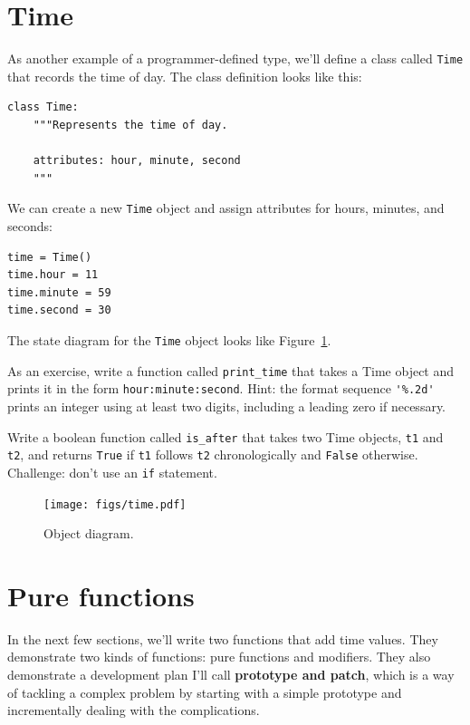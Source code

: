\documentclass[10pt]{book}
\begin{document}
\section{Time}
\label{isafter}

As another example of a programmer-defined type, we'll define a class
called {\tt Time} that records the time of day.  The class definition
looks like this: 
  

\begin{verbatim}
class Time:
    """Represents the time of day.

    attributes: hour, minute, second
    """
\end{verbatim}
%
We can create a new {\tt Time} object and assign
attributes for hours, minutes, and seconds:

\begin{verbatim}
time = Time()
time.hour = 11
time.minute = 59
time.second = 30
\end{verbatim}
%
The state diagram for the {\tt Time} object looks like Figure~\ref{fig.time}.

As an exercise, write a function called \verb"print_time" that takes a
Time object and prints it in the form {\tt hour:minute:second}.
Hint: the format sequence \verb"'%.2d'" prints an integer using
at least two digits, including a leading zero if necessary.

Write a boolean function called \verb"is_after" that
takes two Time objects, {\tt t1} and {\tt t2}, and
returns {\tt True} if {\tt t1} follows {\tt t2} chronologically and
{\tt False} otherwise.  Challenge: don't use an {\tt if} statement.

\begin{figure}
\centerline
{\texttt{[image: figs/time.pdf]}}
\caption{Object diagram.}
\label{fig.time}
\end{figure}


\section{Pure functions}

In the next few sections, we'll write two functions that add time
values.  They demonstrate two kinds of functions: pure functions and
modifiers.  They also demonstrate a development plan I'll call {\bf
  prototype and patch}, which is a way of tackling a complex problem
by starting with a simple prototype and incrementally dealing with the
complications.
\end{document}
